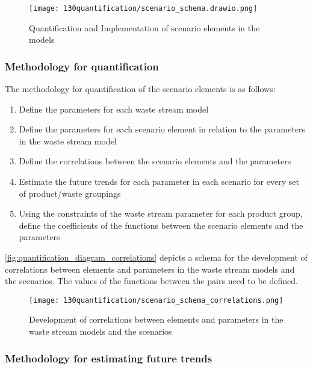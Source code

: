 \begin{landscape}
  \begin{figure}[h]
    \centering
    \texttt{[image: 130quantification/scenario\_schema.drawio.png]}
    \caption{Quantification and Implementation of scenario elements in the models}
    \label{fig:quantification_diagram}
    \end{figure}
\end{landscape}

\subsubsection{Methodology for quantification}

The methodology for quantification of the scenario elements is as follows:

\begin{enumerate}
  \item Define the parameters for each waste stream model
  \item Define the parameters for each scenario element in relation to the parameters in the waste stream model
  \item Define the correlations between the scenario elements and the parameters
  \item Estimate the future trends for each parameter in each scenario for every set of product/waste groupings
  \item Using the constraints of the waste stream parameter for each product group, define the coefficients of the functions between the scenario elements and the parameters
\end{enumerate}


\autoref{fig:quantification_diagram_correlations} depicts a schema for the development of correlations between elements and parameters in the waste stream models and the scenarios. The values of the functions between the pairs need to be defined.

\begin{landscape}
  \begin{figure}[h]
    \centering
    \texttt{[image: 130quantification/scenario\_schema\_correlations.png]}
    \caption{Development of correlations between elements and parameters in the waste stream models and the scenarios}
    \label{fig:quantification_diagram_correlations}
    \end{figure}
\end{landscape}

\subsubsection{Methodology for estimating future trends}

